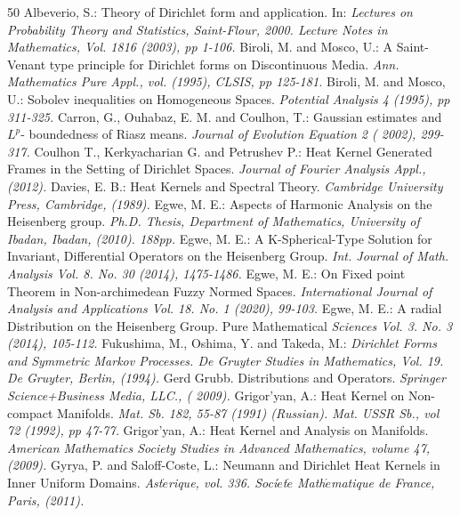 \documentclass[10pt]{article}
\theoremstyle{definition}
\numberwithin{equation}{section}
\begin{document}
\begin{thebibliography}{50}
 Albeverio, S.: Theory of Dirichlet form and application. In: \textit{Lectures on Probability Theory and Statistics, Saint-Flour, 2000. Lecture Notes in Mathematics, Vol. 1816 (2003), pp 1-106.}
 Biroli, M. and Mosco, U.: A Saint-Venant type principle for Dirichlet forms on Discontinuous Media. \textit{Ann. Mathematics Pure Appl., vol.  (1995), CLSIS, pp 125-181.}
 Biroli, M. and Mosco, U.: Sobolev inequalities on Homogeneous Spaces.  \textit{Potential Analysis 4 (1995), pp 311-325.}
 Carron, G., Ouhabaz, E. M. and Coulhon, T.: Gaussian estimates and $L^p$- boundedness of Riasz means. \textit{Journal of Evolution Equation 2 ( 2002), 299-317.}
  Coulhon T., Kerkyacharian G. and Petrushev P.: Heat Kernel Generated Frames in the Setting of Dirichlet Spaces. \textit{Journal of Fourier Analysis Appl.,  (2012).}
\bibitem Davies, E. B.: Heat Kernels and Spectral Theory. \textit{Cambridge University Press, Cambridge,  (1989).}
 Egwe, M. E.: Aspects of Harmonic Analysis on the Heisenberg group. \emph{Ph.D. Thesis, Department of Mathematics, University of Ibadan, Ibadan, (2010). 188pp.}
	Egwe, M. E.: A K-Spherical-Type Solution for Invariant, Differential Operators on the Heisenberg Group. \emph{Int. Journal of Math. Analysis Vol. 8. No. 30 (2014), 1475-1486.}
 Egwe, M. E.: On Fixed point Theorem in Non-archimedean Fuzzy Normed Spaces. \emph{International Journal of Analysis and Applications Vol. 18. No. 1 (2020),  99-103.}
  Egwe, M. E.: A radial Distribution on the Heisenberg Group. Pure Mathematical \emph{Sciences Vol. 3. No. 3 (2014), 105-112.}
 Fukushima, M., Oshima, Y. and Takeda, M.: \textit{Dirichlet Forms and Symmetric Markov Processes. De Gruyter Studies in Mathematics, Vol. 19. De Gruyter, Berlin,  (1994).}
	 Gerd Grubb. Distributions  and  Operators.  \textit{Springer Science+Business Media, LLC., ( 2009).}
 Grigor'yan, A.: Heat Kernel on Non-compact Manifolds. \textit{Mat. Sb. 182, 55-87 (1991) (Russian). Mat. USSR Sb., vol 72 (1992), pp 47-77.}
 Grigor'yan, A.: Heat Kernel and Analysis on Manifolds. \textit{American Mathematics Society Studies in Advanced Mathematics, volume 47, (2009).}
 Gyrya, P. and Saloff-Coste, L.: Neumann and Dirichlet Heat Kernels in Inner Uniform Domains. \emph{Ast$\acute{e}$rique, vol. 336. Soci$\acute{e}$t$\acute{e}$ Math$\acute{e}$matique de France, Paris,  (2011). }

\end{thebibliography}
\end{document}
